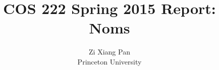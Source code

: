 \documentclass[12pt]{article}
\begin{document}
	
\title{\textbf{COS 222 Spring 2015 Report: Noms}}
	
\author{
		Zi Xiang Pan \\
		Princeton University}
	
\end{document}
